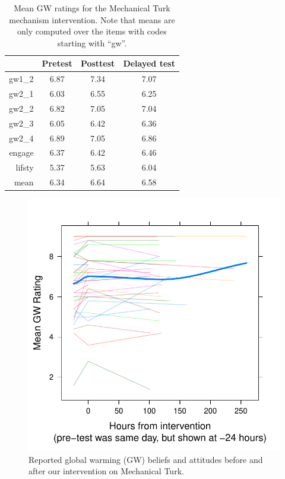 \begin{table}
\caption{Mean GW ratings for the Mechanical Turk mechanism intervention. Note
    that means are only computed over the items with codes starting with
    “\textsf{gw}”.}
\label{table:CCO-mech-gw-means}
\centering
\begin{tabular}{>{\sffamily}rccc}
  \toprule
         & Pretest & Posttest & Delayed test \\ 
  \midrule
  gw1_2 & 6.87 & 7.34 & 7.07 \\ 
  gw2_1 & 6.03 & 6.55 & 6.25 \\ 
  gw2_2 & 6.82 & 7.05 & 7.04 \\ 
  gw2_3 & 6.05 & 6.42 & 6.36 \\ 
  gw2_4 & 6.89 & 7.05 & 6.86 \\ 
  engage & 6.37 & 6.42 & 6.46 \\ 
  lifsty & 5.37 & 5.63 & 6.04 \\ 
  \midrule
  mean & 6.34 & 6.64 & 6.58 \\
   \bottomrule
\end{tabular}
\end{table}

\begin{figure}
    \centering
    \includegraphics{CCO-mech-GW.pdf}
    \caption{Reported global warming (GW) beliefs and attitudes before and after
        our intervention on Mechanical Turk.}
    \label{fig:CCO-mech-GW}
\end{figure}


